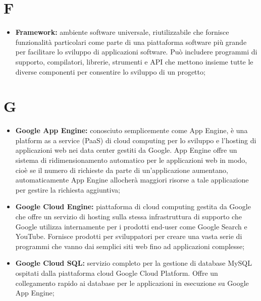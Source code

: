 %


\section*{F} %
\label{sec:f}
	\begin{itemize}
		\item \textbf{Framework:} ambiente software universale, riutilizzabile che fornisce funzionalità particolari come parte di una piattaforma software più grande per facilitare lo sviluppo di applicazioni software. Può includere programmi di supporto, compilatori, librerie, strumenti e API che mettono insieme tutte le diverse componenti per consentire lo sviluppo di un progetto;
	\end{itemize}
\pagebreak

\section*{G} %
\label{sec:g}
	\begin{itemize}
		\item \textbf{Google App Engine:} conosciuto semplicemente come App Engine, è una platform as a service (PaaS) di cloud computing per lo sviluppo e l'hosting di applicazioni web nei data center gestiti da Google. App Engine offre un sistema di ridimensionamento automatico per le applicazioni web in modo, cioè se il numero di richieste da parte di un'applicazione aumentano, automaticamente App Engine allocherà maggiori risorse a tale applicazione per gestire la richiesta aggiuntiva;
		\item \textbf{Google Cloud Engine:} piattaforma di cloud computing gestita da Google che offre un servizio di hosting sulla stessa infrastruttura di supporto che Google utilizza internamente per i prodotti end-user come Google Search e YouTube. Fornisce prodotti per sviluppatori per creare una vasta serie di programmi che vanno dai semplici siti web fino ad applicazioni complesse;
		\item \textbf{Google Cloud SQL:} servizio completo per la gestione di database MySQL ospitati dalla piattaforma cloud Google Cloud Platform. Offre un collegamento rapido ai database per le applicazioni in esecuzione su Google App Engine;
	\end{itemize}
\pagebreak

